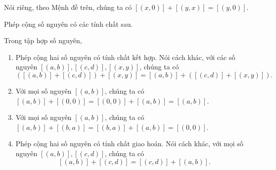 Nói riêng, theo Mệnh đề trên, chúng ta có $[(x, 0)] + [(y, x)] = [(y, 0)]$.

Phép cộng số nguyên có các tính chất sau.
\begin{theorem}\label{theorem:group-of-integers}
    Trong tập hợp số nguyên,
    \begin{enumerate}[label={(\roman*)}]
        \item Phép cộng hai số nguyên có tính chất kết hợp. Nói cách khác, với các số nguyên $[(a, b)], [(c, d)], [(x, y)]$, chúng ta có
              \[
                  ([(a, b)] + [(c, d)]) + [(x, y)] = [(a, b)] + ([(c, d)] + [(x, y)]).
              \]
        \item Với mọi số nguyên $[(a, b)]$, chúng ta có $[(a, b)] + [(0, 0)] = [(0, 0)] + [(a, b)] = [(a, b)]$.
        \item Với mọi số nguyên $[(a, b)]$, chúng ta có $[(a, b)] + [(b, a)] = [(b, a)] + [(a, b)] = [(0, 0)]$.
        \item Phép cộng hai số nguyên có tính chất giao hoán. Nói cách khác, với mọi số nguyên $[(a, b)], [(c, d)]$, chúng ta có
              \[
                  [(a, b)] + [(c, d)] = [(c, d)] + [(a, b)].
              \]
    \end{enumerate}
\end{theorem}

